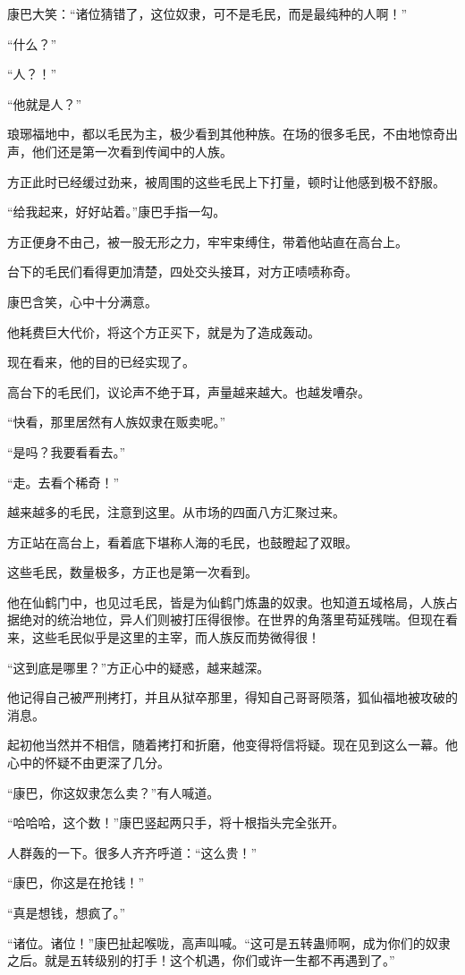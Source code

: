 \begin{this_body}
康巴大笑：“诸位猜错了，这位奴隶，可不是毛民，而是最纯种的人啊！”

“什么？”

“人？！”

“他就是人？”

琅琊福地中，都以毛民为主，极少看到其他种族。在场的很多毛民，不由地惊奇出声，他们还是第一次看到传闻中的人族。

方正此时已经缓过劲来，被周围的这些毛民上下打量，顿时让他感到极不舒服。

“给我起来，好好站着。”康巴手指一勾。

方正便身不由己，被一股无形之力，牢牢束缚住，带着他站直在高台上。

台下的毛民们看得更加清楚，四处交头接耳，对方正啧啧称奇。

康巴含笑，心中十分满意。

他耗费巨大代价，将这个方正买下，就是为了造成轰动。

现在看来，他的目的已经实现了。

高台下的毛民们，议论声不绝于耳，声量越来越大。也越发嘈杂。

“快看，那里居然有人族奴隶在贩卖呢。”

“是吗？我要看看去。”

“走。去看个稀奇！”

越来越多的毛民，注意到这里。从市场的四面八方汇聚过来。

方正站在高台上，看着底下堪称人海的毛民，也鼓瞪起了双眼。

这些毛民，数量极多，方正也是第一次看到。

他在仙鹤门中，也见过毛民，皆是为仙鹤门炼蛊的奴隶。也知道五域格局，人族占据绝对的统治地位，异人们则被打压得很惨。在世界的角落里苟延残喘。但现在看来，这些毛民似乎是这里的主宰，而人族反而势微得很！

“这到底是哪里？”方正心中的疑惑，越来越深。

他记得自己被严刑拷打，并且从狱卒那里，得知自己哥哥陨落，狐仙福地被攻破的消息。

起初他当然并不相信，随着拷打和折磨，他变得将信将疑。现在见到这么一幕。他心中的怀疑不由更深了几分。

“康巴，你这奴隶怎么卖？”有人喊道。

“哈哈哈，这个数！”康巴竖起两只手，将十根指头完全张开。

人群轰的一下。很多人齐齐呼道：“这么贵！”

“康巴，你这是在抢钱！”

“真是想钱，想疯了。”

“诸位。诸位！”康巴扯起喉咙，高声叫喊。“这可是五转蛊师啊，成为你们的奴隶之后。就是五转级别的打手！这个机遇，你们或许一生都不再遇到了。”


\end{this_body}
